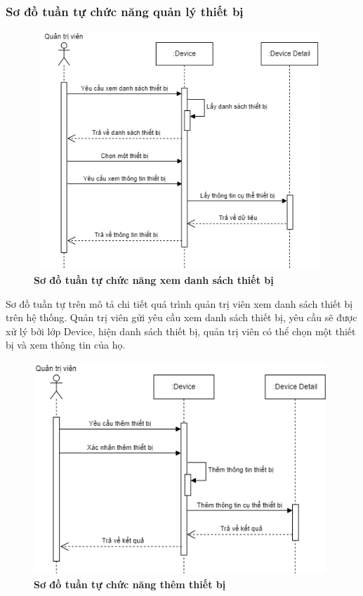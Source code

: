 \subsubsection{Sơ đồ tuần tự chức năng quản lý thiết bị}
\begin{figure}[H]
  \centering
  \includegraphics[width=11cm,height=9cm]{Images/sequence/sequence_manage_device.png}
  \caption[Sơ đồ tuần tự chức năng xem danh sách thiết bị]{\bfseries \fontsize{12pt}{0pt}
  \selectfont Sơ đồ tuần tự chức năng xem danh sách thiết bị}
  \label{sequence_manage_device} %
\end{figure}
Sơ đồ tuần tự trên mô tả chi tiết quá trình quản trị viên xem danh sách thiết bị trên hệ thống. Quản trị viên gửi yêu cầu xem danh sách thiết bị, 
yêu cầu sẽ được xử lý bởi lớp Device, hiện danh sách thiết bị, quản trị viên có thể chọn một thiết bị và xem thông tin của họ. 
\begin{figure}[H]
  \centering
  \includegraphics[width=11cm,height=8cm]{Images/sequence/sequence_manage_add_device.png}
  \caption[Sơ đồ tuần tự chức năng thêm thiết bị]{\bfseries \fontsize{12pt}{0pt}
  \selectfont Sơ đồ tuần tự chức năng thêm thiết bị}
  \label{sequence_manage_add_device} %
\end{figure}
